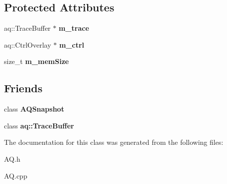 \subsection*{Protected Attributes}
\begin{DoxyCompactItemize}
\item 
aq\+::\+Trace\+Buffer $\ast$ {\bfseries m\+\_\+trace}\hypertarget{class_a_q_ac495082150eee429fa69db42503740fc}{}\label{class_a_q_ac495082150eee429fa69db42503740fc}

\item 
aq\+::\+Ctrl\+Overlay $\ast$ {\bfseries m\+\_\+ctrl}\hypertarget{class_a_q_aff98da408bd5646a825ddd4a1ac09d8d}{}\label{class_a_q_aff98da408bd5646a825ddd4a1ac09d8d}

\item 
size\+\_\+t {\bfseries m\+\_\+mem\+Size}\hypertarget{class_a_q_a400bbc49f484b688dc54ff4cc158cf31}{}\label{class_a_q_a400bbc49f484b688dc54ff4cc158cf31}

\end{DoxyCompactItemize}
\subsection*{Friends}
\begin{DoxyCompactItemize}
\item 
class {\bfseries A\+Q\+Snapshot}\hypertarget{class_a_q_a2f333d9188156b1bd94bce1fa73a38e0}{}\label{class_a_q_a2f333d9188156b1bd94bce1fa73a38e0}

\item 
class {\bfseries aq\+::\+Trace\+Buffer}\hypertarget{class_a_q_aaaed3688bb4cfc2496b3204ca4388b6a}{}\label{class_a_q_aaaed3688bb4cfc2496b3204ca4388b6a}

\end{DoxyCompactItemize}


The documentation for this class was generated from the following files\+:\begin{DoxyCompactItemize}
\item 
A\+Q.\+h\item 
A\+Q.\+cpp\end{DoxyCompactItemize}
